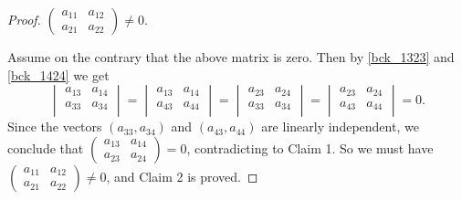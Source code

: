 \documentclass[10pt,a4paper]{amsart}
\begin{document}
\begin{proof}
  $\begin{pmatrix}a_{11} & a_{12} \\ a_{21} & a_{22} \end{pmatrix} \neq 0$.

Assume on the contrary that the above matrix is zero. Then by \eqref{bck_1323} and \eqref{bck_1424} we get
$$ \begin{vmatrix} a_{13} & a_{14} \\ a_{33} & a_{34} \\ \end{vmatrix} = \begin{vmatrix} a_{13} & a_{14} \\ a_{43} & a_{44} \\ \end{vmatrix} = \begin{vmatrix} a_{23} & a_{24} \\ a_{33} & a_{34} \\ \end{vmatrix} = \begin{vmatrix} a_{23} & a_{24} \\ a_{43} & a_{44} \\ \end{vmatrix} =0.
$$
Since the vectors $(a_{33},a_{34})$ and $(a_{43},a_{44})$ are linearly independent, we conclude that $\begin{pmatrix}a_{13} & a_{14} \\ a_{23} & a_{24} \end{pmatrix} =0$, contradicting to Claim 1. So we must have  $\begin{pmatrix}a_{11} & a_{12} \\ a_{21} & a_{22} \end{pmatrix} \neq 0$, and Claim 2 is proved.


\end{proof}
\end{document}
